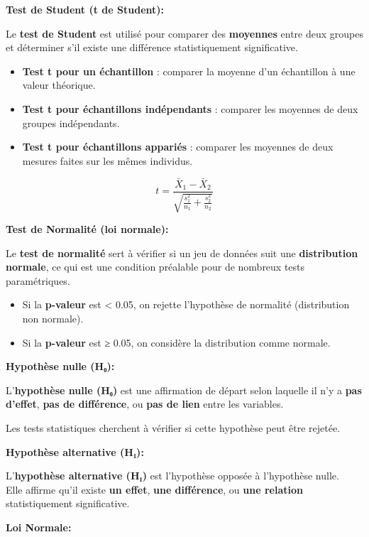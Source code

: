\documentclass[
]{article}
\providecommand{\tightlist}{%
  \setlength{\itemsep}{0pt}\setlength{\parskip}{0pt}}
\begin{document}
\textbf{Test de Student (t de Student):}

Le \textbf{test de Student} est utilisé pour comparer des
\textbf{moyennes} entre deux groupes et déterminer s'il existe une
différence statistiquement significative.

\begin{itemize}
\tightlist
\item
  \textbf{Test t pour un échantillon} : comparer la moyenne d'un
  échantillon à une valeur théorique.
\item
  \textbf{Test t pour échantillons indépendants} : comparer les moyennes
  de deux groupes indépendants.
\item
  \textbf{Test t pour échantillons appariés} : comparer les moyennes de
  deux mesures faites sur les mêmes individus.
\end{itemize}

\[
t = \frac{\bar{X}_1 - \bar{X}_2}{\sqrt{\frac{s_1^2}{n_1} + \frac{s_2^2}{n_2}}}
\]

\textbf{Test de Normalité (loi normale):}

Le \textbf{test de normalité} sert à vérifier si un jeu de données suit
une \textbf{distribution normale}, ce qui est une condition préalable
pour de nombreux tests paramétriques.

\begin{itemize}
\tightlist
\item
  Si la \textbf{p-valeur} est \textless{} 0.05, on rejette l'hypothèse
  de normalité (distribution non normale).
\item
  Si la \textbf{p-valeur} est ≥ 0.05, on considère la distribution comme
  normale.
\end{itemize}

\textbf{Hypothèse nulle (H₀):}

L'\textbf{hypothèse nulle (H₀)} est une affirmation de départ selon
laquelle il n'y a \textbf{pas d'effet}, \textbf{pas de différence}, ou
\textbf{pas de lien} entre les variables.

Les tests statistiques cherchent à vérifier si cette hypothèse peut être
rejetée.

\textbf{Hypothèse alternative (H₁):}

L'\textbf{hypothèse alternative (H₁)} est l'hypothèse opposée à
l'hypothèse nulle.\\
Elle affirme qu'il existe \textbf{un effet}, \textbf{une différence}, ou
\textbf{une relation} statistiquement significative.

\textbf{Loi Normale:}
\end{document}
